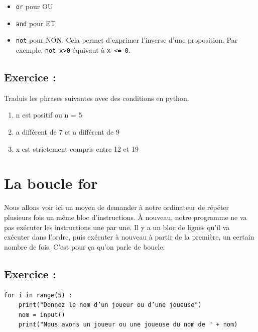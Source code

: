 \documentclass[a4paper,french,11pt]{article}
\begin{document}
\begin{itemize}
\item
  \texttt{or} pour OU
\item
  \texttt{and} pour ET
\item
  \texttt{not} pour NON. Cela permet d'exprimer l'inverse
  d'une proposition. Par exemple, \texttt{not x>0} équivaut
  à \texttt{x <= 0}.
\end{itemize}

\hypertarget{exercice-10}{%
\subsection{Exercice :}\label{exercice-10}}

Traduis les phrases suivantes avec des conditions en python.

\begin{enumerate}
\def\labelenumi{\arabic{enumi}.}
\item
  n est positif ou n = 5
\item
  a différent de 7 et a différent de 9
\item
  x est strictement compris entre 12 et 19
\end{enumerate}

\hypertarget{la-boucle-for}{%
\section{La boucle for}\label{la-boucle-for}}

Nous allons voir ici un moyen de demander à notre ordinateur de répéter
plusieurs fois un même bloc d'instructions. À nouveau, notre programme
ne va pas exécuter les instructions une par une. Il y a un bloc de
lignes qu'il va exécuter dans l'ordre, puis exécuter à nouveau à partir
de la première, un certain nombre de fois. C'est pour ça qu'on parle de
boucle.

\hypertarget{exercice-11}{%
\subsection{Exercice :}\label{exercice-11}}

\begin{verbatim}
for i in range(5) :
    print("Donnez le nom d’un joueur ou d’une joueuse")
    nom = input()
    print("Nous avons un joueur ou une joueuse du nom de " + nom)
\end{verbatim}
\end{document}
